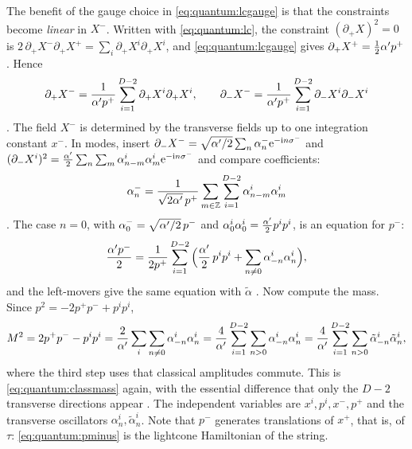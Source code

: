 The benefit of the gauge choice in \cref{eq:quantum:lcgauge} is that the constraints become \emph{linear} in
$X^-$. Written with \cref{eq:quantum:lc}, the constraint $(\partial_+X)^2=0$ is
$2\,\partial_+X^-\partial_+X^+=\sum_i\partial_+X^i\partial_+X^i$, and
\cref{eq:quantum:lcgauge} gives $\partial_+X^+=\frac12\alpha' p^+$. Hence
\begin{equation}\label{eq:quantum:Xminus}
 \partial_+X^-=\frac{1}{\alpha' p^+}\sum_{i=1}^{D-2}\partial_+X^i\partial_+X^i,\qquad
 \partial_-X^-=\frac{1}{\alpha' p^+}\sum_{i=1}^{D-2}\partial_-X^i\partial_-X^i
\end{equation}
. The field $X^-$ is determined by the transverse fields
up to one integration constant $x^-$. In modes, insert
$\partial_-X^-=\sqrt{\alpha'/2}\sum_n\alpha^-_n\mathrm{e}^{-\mathrm{i} n\sigma^-}$ and
$(\partial_-X^i)^2=\frac{\alpha'}2\sum_n\sum_m\alpha^i_{n-m}\alpha^i_m\mathrm{e}^{-\mathrm{i} n\sigma^-}$ and
compare coefficients:
\begin{equation}\label{eq:quantum:alphaminus}
 \alpha^-_n=\frac{1}{\sqrt{2\alpha'}\,p^+}\sum_{m\in\mathbb{Z}}\sum_{i=1}^{D-2}\alpha^i_{n-m}\alpha^i_m
\end{equation}
. The case $n=0$, with $\alpha_0^-=\sqrt{\alpha'/2}\,p^-$ and
$\alpha_0^i\alpha_0^i=\frac{\alpha'}2p^ip^i$, is an equation for $p^-$:
\begin{equation}\label{eq:quantum:pminus}
 \frac{\alpha' p^-}{2}=\frac{1}{2p^+}\sum_{i=1}^{D-2}
   \Big(\frac{\alpha'}2\,p^ip^i+\sum_{n\neq0}\alpha^i_{-n}\alpha^i_n\Big),
\end{equation}
and the left-movers give the same equation with $\tilde\alpha$
. Now compute the mass. Since
$p^2=-2p^+p^-+p^ip^i$,
\begin{equation}\label{eq:quantum:lcmass}
 M^2=2p^+p^--p^ip^i
    =\frac2{\alpha'}\sum_i\sum_{n\ne0}\alpha^i_{-n}\alpha^i_n
    =\frac4{\alpha'}\sum_{i=1}^{D-2}\sum_{n>0}\alpha^i_{-n}\alpha^i_n
    =\frac4{\alpha'}\sum_{i=1}^{D-2}\sum_{n>0}\tilde\alpha^i_{-n}\tilde\alpha^i_n ,
\end{equation}
where the third step uses that classical amplitudes commute. This is
\cref{eq:quantum:classmass} again, with the essential difference that only the $D-2$
transverse directions appear . The independent variables
are $x^i,p^i,x^-,p^+$ and the transverse oscillators $\alpha^i_n,\tilde\alpha^i_n$. Note that
$p^-$ generates translations of $x^+$, that is, of $\tau$: \cref{eq:quantum:pminus} is the
lightcone Hamiltonian of the string.

